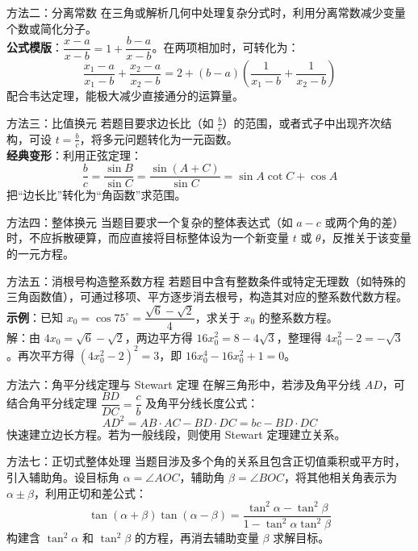 \documentclass[11pt,a4paper]{ctexart}
\begin{document}
\begin{theorembox}{方法二：分离常数}
  在三角或解析几何中处理复杂分式时，利用分离常数减少变量个数或简化分子。\\
  \textbf{公式模版}：$\dfrac{x-a}{x-b} = 1 + \dfrac{b-a}{x-b}$。在两项相加时，可转化为：
  \[
    \frac{x_1-a}{x_1-b} + \frac{x_2-a}{x_2-b} = 2 + (b-a)\left(\frac{1}{x_1-b} + \frac{1}{x_2-b}\right)
  \]
  配合韦达定理，能极大减少直接通分的运算量。
\end{theorembox}

\begin{theorembox}{方法三：比值换元}
  若题目要求边长比（如 $\frac{b}{c}$）的范围，或者式子中出现齐次结构，可设 $t = \frac{b}{c}$，将多元问题转化为一元函数。\\
  \textbf{经典变形}：利用正弦定理：
  \[
    \frac{b}{c} = \frac{\sin B}{\sin C} = \frac{\sin(A+C)}{\sin C} = \sin A \cot C + \cos A
  \]
  把“边长比”转化为“角函数”求范围。
\end{theorembox}

\begin{theorembox}{方法四：整体换元}
  当题目要求一个复杂的整体表达式（如 $a-c$ 或两个角的差）时，不应拆散硬算，而应直接将目标整体设为一个新变量 $t$ 或 $\theta$，反推关于该变量的一元方程。
\end{theorembox}

\begin{theorembox}{方法五：消根号构造整系数方程}
  若题目中含有整数条件或特定无理数（如特殊的三角函数值），可通过移项、平方逐步消去根号，构造其对应的整系数代数方程。\\
  \textbf{示例}：已知 $x_0 = \cos 75^\circ = \dfrac{\sqrt{6}-\sqrt{2}}{4}$，求关于 $x_0$ 的整系数方程。\\
  解：由 $4x_0 = \sqrt{6}-\sqrt{2}$，两边平方得 $16x_0^2 = 8 - 4\sqrt{3}$，整理得 $4x_0^2 - 2 = -\sqrt{3}$。再次平方得 $(4x_0^2-2)^2 = 3$，即 $16x_0^4 - 16x_0^2 + 1 = 0$。
\end{theorembox}

\begin{theorembox}{方法六：角平分线定理与 Stewart 定理}
  在解三角形中，若涉及角平分线 $AD$，可结合角平分线定理 $\dfrac{BD}{DC} = \dfrac{c}{b}$ 及角平分线长度公式：
  \[
    AD^2 = AB \cdot AC - BD \cdot DC = bc - BD \cdot DC
  \]
  快速建立边长方程。若为一般线段，则使用 Stewart 定理建立关系。
\end{theorembox}

\begin{theorembox}{方法七：正切式整体处理}
  当题目涉及多个角的关系且包含正切值乘积或平方时，引入辅助角。设目标角 $\alpha = \angle AOC$，辅助角 $\beta = \angle BOC$，将其他相关角表示为 $\alpha \pm \beta$，利用正切和差公式：
  \[
    \tan(\alpha+\beta)\tan(\alpha-\beta) = \frac{\tan^2\alpha - \tan^2\beta}{1 - \tan^2\alpha\tan^2\beta}
  \]
  构建含 $\tan^2\alpha$ 和 $\tan^2\beta$ 的方程，再消去辅助变量 $\beta$ 求解目标。
\end{theorembox}
\end{document}
